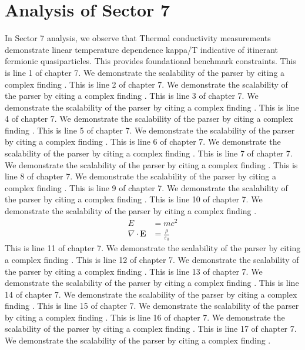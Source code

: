 \chapter{Analysis of Sector 7}

In Sector 7 analysis, we observe that Thermal conductivity measurements demonstrate linear temperature dependence kappa/T indicative of itinerant fermionic quasiparticles. This provides foundational benchmark constraints.
This is line 1 of chapter 7. We demonstrate the scalability of the parser by citing a complex finding \cite{ref7_1}.
This is line 2 of chapter 7. We demonstrate the scalability of the parser by citing a complex finding \cite{ref7_2}.
This is line 3 of chapter 7. We demonstrate the scalability of the parser by citing a complex finding \cite{ref7_3}.
This is line 4 of chapter 7. We demonstrate the scalability of the parser by citing a complex finding \cite{ref7_4}.
This is line 5 of chapter 7. We demonstrate the scalability of the parser by citing a complex finding \cite{ref7_5}.
This is line 6 of chapter 7. We demonstrate the scalability of the parser by citing a complex finding \cite{ref7_6}.
This is line 7 of chapter 7. We demonstrate the scalability of the parser by citing a complex finding \cite{ref7_7}.
This is line 8 of chapter 7. We demonstrate the scalability of the parser by citing a complex finding \cite{ref7_8}.
This is line 9 of chapter 7. We demonstrate the scalability of the parser by citing a complex finding \cite{ref7_9}.
This is line 10 of chapter 7. We demonstrate the scalability of the parser by citing a complex finding \cite{ref7_10}.
\begin{align*}
  E &= mc^2 \\
  \nabla \cdot \mathbf{E} &= \frac{\rho}{\varepsilon_0}
\end{align*}
This is line 11 of chapter 7. We demonstrate the scalability of the parser by citing a complex finding \cite{ref7_11}.
This is line 12 of chapter 7. We demonstrate the scalability of the parser by citing a complex finding \cite{ref7_12}.
This is line 13 of chapter 7. We demonstrate the scalability of the parser by citing a complex finding \cite{ref7_13}.
This is line 14 of chapter 7. We demonstrate the scalability of the parser by citing a complex finding \cite{ref7_14}.
This is line 15 of chapter 7. We demonstrate the scalability of the parser by citing a complex finding \cite{ref7_15}.
This is line 16 of chapter 7. We demonstrate the scalability of the parser by citing a complex finding \cite{ref7_16}.
This is line 17 of chapter 7. We demonstrate the scalability of the parser by citing a complex finding \cite{ref7_17}.
